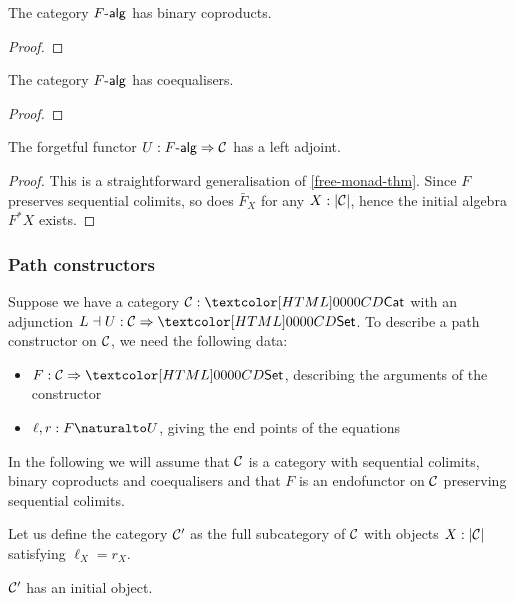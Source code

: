 \begin{proposition}
  The category $\algcat{F}$ has binary coproducts.
\end{proposition}

\begin{proof}
\end{proof}

\begin{proposition}
  The category $\algcat{F}$ has coequalisers.
\end{proposition}

\begin{proof}
\end{proof}

\begin{proposition}
  The forgetful functor $U : \Func{\algcat{F}}{\Cc}$ has a left
  adjoint.
\end{proposition}

\begin{proof}
  This is a straightforward generalisation of
  \cref{free-monad-thm}. Since $F$ preserves sequential colimits, so
  does $\bar{F}_X$ for any $X : | \mathcal{C} |$, hence the initial algebra
  $F^* X$ exists.
\end{proof}

\subsubsection{Path constructors}
Suppose we have a category $\Cc : \Cat$ with an adjunction
$L \dashv U : \Func{\Cc}{\Set}$. To describe a path constructor
on $\mathcal{C}$, we need the following data:
\begin{itemize}
\item $F : \Func{\Cc}{\Set}$, describing the arguments of the constructor
\item $\ell, r : \Nat{F}{U}$, giving the end points of the equations
\end{itemize}

In the following we will assume that $\mathcal{C}$ is a category with
sequential colimits, binary coproducts and coequalisers and that $F$
is an endofunctor on $\mathcal{C}$ preserving sequential colimits.

Let us define the category $\mathcal{C}'$ as the full subcategory of $\mathcal{C}$
with objects $X : | \mathcal{C} |$ satisfying $\ell_X = r_X$.

\begin{proposition}
  $\mathcal{C}'$ has an initial object.
\end{proposition}

